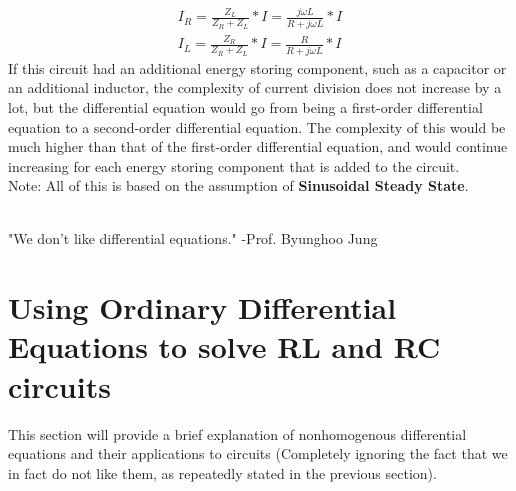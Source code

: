 \documentclass[nobib]{tufte-handout}
\begin{document}
\begin{align*}
    I_R=\frac{Z_L}{Z_R+Z_L}*I=\frac{j \omega L}{R+j \omega L}*I \\
    I_L=\frac{Z_R}{Z_R+Z_L}*I=\frac{R}{R+j \omega L}*I
\end{align*}
If this circuit had an additional energy storing component, such as a capacitor
or an additional inductor, the complexity of current division does not increase
by a lot, but the differential equation would go from being a first-order differential
equation to a second-order differential equation. The complexity of this would be much
higher than that of the first-order differential equation, and would continue increasing
for each energy storing component that is added to the circuit.\\
Note: All of this is based on the assumption of \textbf{Sinusoidal Steady State}.
\\~\\
\begin{center}
    "We don't like differential equations." -Prof. Byunghoo Jung
\end{center}
\pagebreak
\section{Using Ordinary Differential Equations to solve RL and RC circuits}
This section will provide a brief explanation of nonhomogenous differential
equations and their applications to circuits (Completely ignoring the fact that
we in fact do not like them, as repeatedly stated in the previous section).
\end{document}
